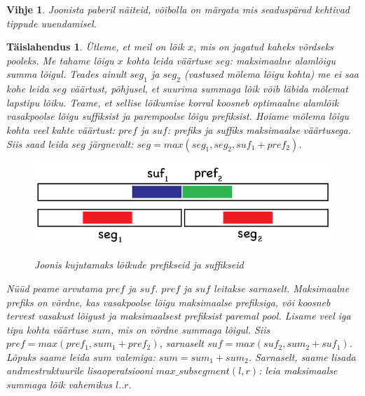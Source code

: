 \documentclass{trkut}
\newtheorem*{vihje}{Vihje}
\newtheorem*{solution}{Täislahendus}
\begin{document}
\begin{vihje}
Joonista paberil näiteid, võibolla on märgata mis seaduspärad kehtivad tippude uuendamisel.
\end{vihje}

\begin{solution}
Ütleme, et meil on lõik $x$, mis on jagatud kaheks võrdseks pooleks.
Me tahame lõigu $x$ kohta leida väärtuse $seg$: maksimaalne alamlõigu summa lõigul. Teades ainult $seg_1$ ja $seg_2$ (vastused mõlema lõigu kohta) me ei saa kohe leida $seg$ väärtust, põhjusel, et suurima summaga lõik võib läbida mõlemat lapstipu lõiku.
Teame, et sellise lõikumise korral koosneb optimaalne alamlõik vasakpoolse lõigu suffiksist ja parempoolse lõigu prefiksist.
Hoiame mõlema lõigu kohta veel kahte väärtust: $pref$ ja $suf$: prefiks ja suffiks maksimaalse väärtusega. Siis saad leida $seg$ järgnevalt: $seg=max(seg_1,seg_2,suf_1+pref_2)$.


\begin{figure}[H]%
    \includegraphics[width=12cm]{sumseg.png}%
    \caption{Joonis kujutamaks lõikude prefikseid ja suffikseid}%
    \label{joonis}%
\end{figure}

Nüüd peame arvutama $pref$ ja $suf$.
$pref$ ja $suf$ leitakse sarnaselt.
Maksimaalne prefiks on võrdne, kas vasakpoolse lõigu maksimaalse prefiksiga, või koosneb tervest vasakust lõigust ja maksimaalsest prefiksist paremal pool.
Lisame veel iga tipu kohta väärtuse $sum$, mis on võrdne summaga lõigul. Siis $pref=max(pref_1,sum_1+pref_2)$, sarnaselt $suf=max(suf_2,sum_2+suf_1)$.
Lõpuks saame leida $sum$ valemiga: $sum=sum_1+sum_2$.
Sarnaselt, saame lisada andmestruktuurile lisaoperatsiooni $max\_subsegment(l,r)$: leia maksimaalse summaga lõik vahemikus $l..r$.
\end{solution}
\end{document}
